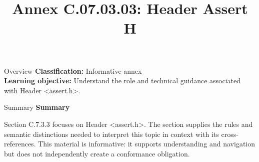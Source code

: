 \documentclass[10pt,letterpaper]{article}
\title{Annex C.07.03.03: Header Assert H}
\author{}
\date{}
\begin{document}
\maketitle
\begin{CornellOverviewBox}{Overview}
\textbf{Classification:} Informative annex\\[2pt]
\textbf{Learning objective:} Understand the role and technical guidance associated with Header <assert.h>.
\end{CornellOverviewBox}\begin{CornellSummaryBox}{Summary}
{\sffamily\bfseries\color{Accent} Summary}\par\vspace{3pt}Section C.7.3.3 focuses on Header <assert.h>. The section supplies the rules and semantic distinctions needed to interpret this topic in context with its cross-references. This material is informative: it supports understanding and navigation but does not independently create a conformance obligation.
\end{CornellSummaryBox}
\end{document}
